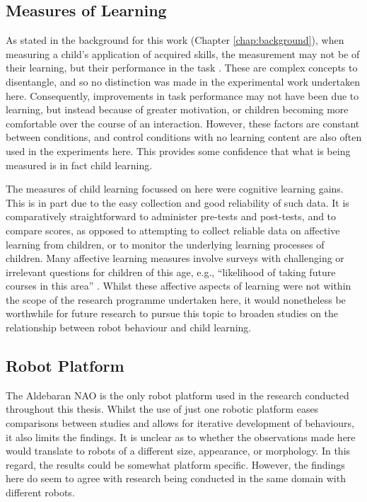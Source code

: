 \subsection{Measures of Learning} \label{sec:disc-measures}
As stated in the background for this work (Chapter \ref{chap:background}), when measuring a child's application of acquired skills, the measurement may not be of their \gls{learning}, but their performance in the task \citep{mikulas1977learning}. These are complex concepts to disentangle, and so no distinction was made in the experimental work undertaken here. Consequently, improvements in task performance may not have been due to \gls{learning}, but instead because of greater motivation, or children becoming more comfortable over the course of an interaction. However, these factors are constant between conditions, and control conditions with no learning content are also often used in the experiments here. This provides some confidence that what is being measured is in fact child \gls{learning}.

The measures of child \gls{learning} focussed on here were cognitive \gls{learning} gains. This is in part due to the easy collection and good reliability of such data. It is comparatively straightforward to administer pre-tests and post-tests, and to compare scores, as opposed to attempting to collect reliable data on affective \gls{learning} from children, or to monitor the underlying \gls{learning} processes of children. Many affective \gls{learning} measures involve surveys with challenging or irrelevant questions for children of this age, e.g., ``likelihood of taking future courses in this area'' \citep{mccroskey1994assessment}. Whilst these affective aspects of \gls{learning} were not within the scope of the research programme undertaken here, it would nonetheless be worthwhile for future research to pursue this topic to broaden studies on the relationship between robot behaviour and child \gls{learning}.

\subsection{Robot Platform} \label{sec:disc-platform}
The Aldebaran NAO is the only robot platform used in the research conducted throughout this thesis. Whilst the use of just one robotic platform eases comparisons between studies and allows for iterative development of behaviours, it also limits the findings. It is unclear as to whether the observations made here would translate to robots of a different size, appearance, or morphology. In this regard, the results could be somewhat platform specific. However, the findings here do seem to agree with research being conducted in the same domain with different robots.

